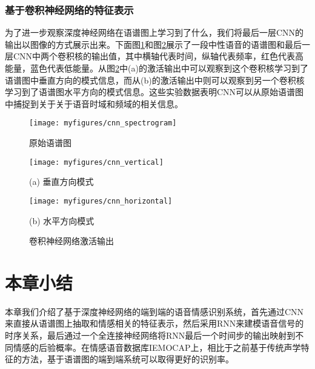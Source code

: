 \subsubsection{基于卷积神经网络的特征表示}
\label{sssec:end2end_cnn_feature}

为了进一步观察深度神经网络在语谱图上学习到了什么，我们将最后一层CNN的输出以图像的方式展示出来。下面图\ref{fig:cnn_spectrogram}和图\ref{fig:cnn_activation}展示了一段中性语音的语谱图和最后一层CNN中两个卷积核的输出值，其中横轴代表时间，纵轴代表频率，红色代表高能量，蓝色代表低能量。从图\ref{fig:cnn_activation}中(a)的激活输出中可以观察到这个卷积核学习到了语谱图中垂直方向的模式信息，而从(b)的激活输出中则可以观察到另一个卷积核学习到了语谱图水平方向的模式信息。这些实验数据表明CNN可以从原始语谱图中捕捉到关于关于语音时域和频域的相关信息。

\begin{figure}[htb] %
    \centering
    \texttt{[image: myfigures/cnn\_spectrogram]}
    \caption{原始语谱图}
    \label{fig:cnn_spectrogram}
\end{figure}

\begin{figure}[htb]
    \begin{minipage}{0.48\textwidth}
        \centering
        \texttt{[image: myfigures/cnn\_vertical]}
        \centerline{(a) 垂直方向模式}\medskip
    \end{minipage}\hfill
    \begin{minipage}{0.48\textwidth}
        \centering
        \texttt{[image: myfigures/cnn\_horizontal]}
        \centerline{(b) 水平方向模式}\medskip
    \end{minipage}
\caption{卷积神经网络激活输出}
\label{fig:cnn_activation}
\end{figure}

\section{本章小结}
\label{sec:end2end_summary}

本章我们介绍了基于深度神经网络的端到端的语音情感识别系统，首先通过CNN来直接从语谱图上抽取和情感相关的特征表示，然后采用RNN来建模语音信号的时序关系，最后通过一个全连接神经网络将RNN最后一个时间步的输出映射到不同情感的后验概率。在情感语音数据库IEMOCAP上，相比于之前基于传统声学特征的方法，基于语谱图的端到端系统可以取得更好的识别率。